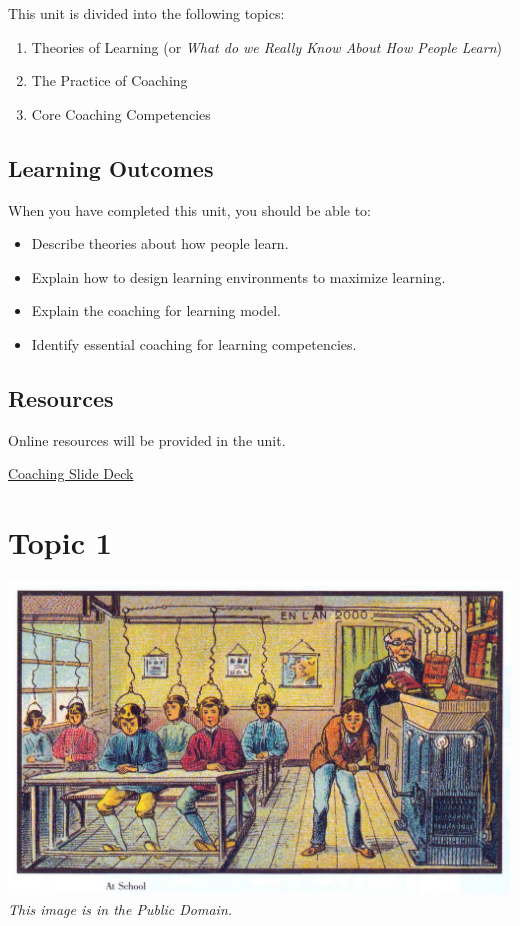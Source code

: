 \documentclass[
]{book}
\providecommand{\tightlist}{%
  \setlength{\itemsep}{0pt}\setlength{\parskip}{0pt}}
\begin{document}
This unit is divided into the following topics:

\begin{enumerate}
\def\labelenumi{\arabic{enumi}.}
\tightlist
\item
  Theories of Learning (or \emph{What do we Really Know About How People Learn})
\item
  The Practice of Coaching
\item
  Core Coaching Competencies
\end{enumerate}

\hypertarget{learning-outcomes-2}{%
\subsection*{Learning Outcomes}\label{learning-outcomes-2}}

When you have completed this unit, you should be able to:

\begin{itemize}
\tightlist
\item
  Describe theories about how people learn.
\item
  Explain how to design learning environments to maximize learning.
\item
  Explain the coaching for learning model.
\item
  Identify essential coaching for learning competencies.
\end{itemize}

\hypertarget{resources-3}{%
\subsection*{Resources}\label{resources-3}}

Online resources will be provided in the unit.

\href{https://far.twu.ca/ldrs/663-202103/presentations/coaching\#/coaching-0}{Coaching Slide Deck}

\hypertarget{topic-1-1}{%
\section*{Topic 1}\label{topic-1-1}}

\includegraphics{assets/u4/France_in_XXI_Century._School.jpg}
\emph{This image is in the Public Domain.}
\end{document}
